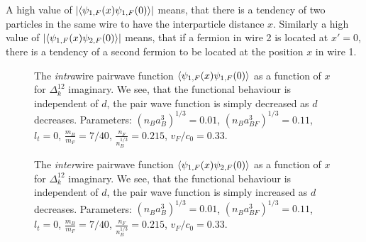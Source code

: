 A high value of $\left|\braket{\psi_{1,F}(x)\psi_{1,F}(0)}\right|$ means, that there is a tendency of two particles in the same wire to have the interparticle distance $x$. Similarly a high value of $\left|\braket{\psi_{1,F}(x)\psi_{2,F}(0)}\right|$ means, that if a fermion in wire 2 is located at $x' = 0$, there is a tendency of a second fermion to be located at the position $x$ in wire 1.  

\begin{figure} 
\begin{center}  
  
\caption{The \textit{intra}wire pairwave function $\braket{\psi_{1,F}(x)\psi_{1,F}(0)}$ as a function of $x$ for $\Delta^{12}_k$ imaginary. We see, that the functional behaviour is independent of $d$, the pair wave function is simply decreased as $d$ decreases. Parameters: $(n_Ba_B^3)^{1/3} = 0.01$, $(n_Ba_{BF}^3)^{1/3} = 0.11$, $l_t = 0$, $\frac{m_B}{m_F} = 7/40$, $\frac{n_F}{n_B^{1/3}} = 0.215$, $v_F/c_0 = 0.33$. }  
\label{fig.2wirespairwavefunction11}  
\vspace{0.5cm}
  
\caption{The \textit{inter}wire pairwave function $\braket{\psi_{1,F}(x)\psi_{2,F}(0)}$ as a function of $x$ for $\Delta^{12}_k$ imaginary. We see, that the functional behaviour is independent of $d$, the pair wave function is simply increased as $d$ decreases. Parameters: $(n_Ba_B^3)^{1/3} = 0.01$, $(n_Ba_{BF}^3)^{1/3} = 0.11$, $l_t = 0$, $\frac{m_B}{m_F} = 7/40$, $\frac{n_F}{n_B^{1/3}} = 0.215$, $v_F/c_0 = 0.33$. }  
\label{fig.2wirespairwavefunction12}  
\end{center}    
\end{figure}

